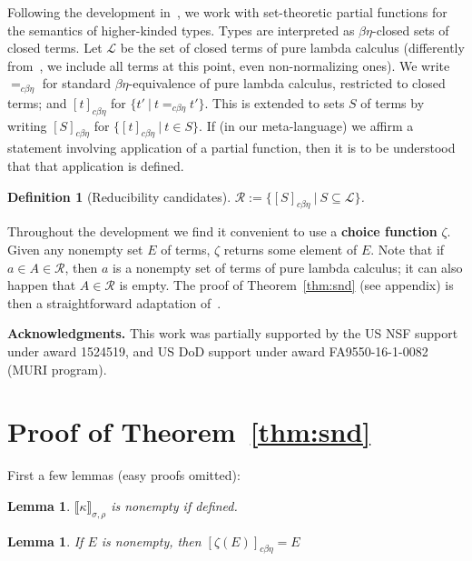 \documentclass{article}
\newcommand{\choice}[0]{\zeta}
\newcommand{\interp}[1]{\llbracket #1 \rrbracket}
\newcommand{\cbe}[0]{c\beta\eta}
\newtheorem{definition}[theorem]{Definition}
\newtheorem{lemma}[theorem]{Lemma}
\begin{document}
Following the development in~\cite{stump17}, we work with
set-theoretic partial functions for the semantics of higher-kinded
types.  Types are interpreted as $\beta\eta$-closed sets of closed
terms. Let $\mathcal{L}$ be the set of closed terms of pure lambda calculus
(differently from~\cite{stump17}, we include all terms at this point,
even non-normalizing ones).  We
write $=_{\cbe}$ for standard $\beta\eta$-equivalence of pure lambda calculus, restricted to
closed terms; and $[t]_{\cbe}$ for $\{ t'\ |\ t =_{\cbe} t'\}$.  This
is extended to sets $S$ of terms by writing $[S]_{\cbe}$ for
$\{[t]_{\cbe}\ |\ t\in S\}$.  %
If (in our meta-language) we affirm a statement
involving application of a partial function, then it is to be
understood that that application is defined.

\begin{definition}[Reducibility candidates]
  $\mathcal{R} := \{ [S]_{\cbe}\ |\ S\subseteq \mathcal{L} \}$.
\end{definition}

Throughout the development we find it convenient to use a
\textbf{choice function} $\choice$.  Given any nonempty set $E$ of
terms, $\choice$ returns some element of $E$.  Note that if $a \in A
\in \mathcal{R}$, then $a$ is a nonempty set of terms of pure lambda
calculus; it can also happen that $A \in\mathcal{R}$ is empty.  The
proof of Theorem~\ref{thm:snd} (see appendix) is then a straightforward adaptation of~\cite{stump17}. 

\textbf{Acknowledgments.}  This work was partially supported by the US
NSF support under award 1524519, and US DoD support under award
FA9550-16-1-0082 (MURI program).






\appendix

\section{Proof of Theorem~\ref{thm:snd}}

First a few lemmas (easy proofs omitted):

\begin{lemma}
  $\interp{\kappa}_{\sigma,\rho}$ is nonempty if defined.
\end{lemma}

\begin{lemma}
\label{lem:choice}
If $E$ is nonempty, then $[\choice(E)]_{\cbe} = E$
\end{lemma}
\end{document}
